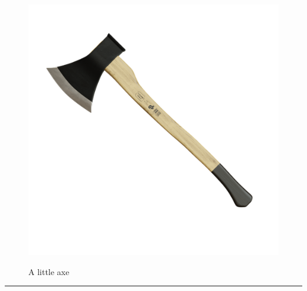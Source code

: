 \documentclass{article}
\begin{document}
    \begin{figure}[H]
        \centering
        \begin{minipage}{0.25\textwidth}
            \centering
            \includegraphics[width=\textwidth]{../SurvivalItemImages/axe}
        \end{minipage}\hfill
        \begin{minipage}{0.7\textwidth}
            \centering
            \Large A little axe
        \end{minipage}
    \end{figure}
    \vspace{-0.8em}
    \noindent\rule{\textwidth}{0.4pt}
            
\end{document}
